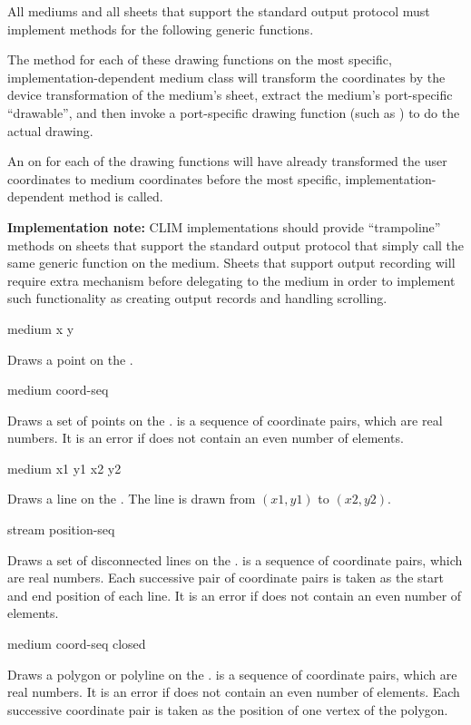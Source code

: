 All mediums and all sheets that support the standard output protocol must
implement methods for the following generic functions.

The method for each of these drawing functions on the most specific,
implementation-dependent medium class will transform the coordinates by the
device transformation of the medium's sheet, extract the medium's port-specific
``drawable'', and then invoke a port-specific drawing function (such as
) to do the actual drawing.

An  on  for each of the drawing functions will have
already transformed the user coordinates to medium coordinates before the most
specific, implementation-dependent method is called.

{\bf Implementation note:} CLIM implementations should provide ``trampoline''
methods on sheets that support the standard output protocol that simply call the
same generic function on the medium.  Sheets that support output recording will
require extra mechanism before delegating to the medium in order to implement
such functionality as creating output records and handling scrolling.

 {medium x y}

Draws a point on the  .  

 {medium coord-seq}

Draws a set of points on the  .   is a
sequence of coordinate pairs, which are real numbers.  It is an error if
 does not contain an even number of elements.

 {medium x1 y1 x2 y2}

Draws a line on the  .  The line is drawn from
$(x1,y1)$ to $(x2,y2)$.

 {stream position-seq} 

Draws a set of disconnected lines on the  .
 is a sequence of coordinate pairs, which are real numbers.  Each
successive pair of coordinate pairs is taken as the start and end position of
each line.  It is an error if  does not contain an even number of
elements.

 {medium coord-seq closed}

Draws a polygon or polyline on the  .  
is a sequence of coordinate pairs, which are real numbers.  It is an error if
 does not contain an even number of elements.  Each successive
coordinate pair is taken as the position of one vertex of the polygon.

